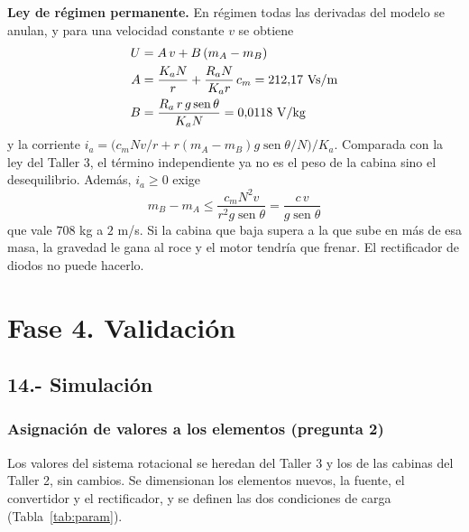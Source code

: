 \documentclass[10pt,a4paper,twocolumn]{article}
\DeclareMathOperator{\sen}{sen}
\begin{document}
\noindent\textbf{Ley de régimen permanente.} En régimen todas las derivadas del modelo se
anulan, y para una velocidad constante $v$ se obtiene
\begin{align}
  U &= A\,v + B\,(m_A - m_B) \label{eq:ley}\\
  A &= \frac{K_a N}{r} + \frac{R_a N}{K_a r}\,c_m = 212{,}17\ \mathrm{Vs/m} \notag\\
  B &= \frac{R_a\, r\, g\sen\theta}{K_a N} = 0{,}0118\ \mathrm{V/kg} \notag
\end{align}
y la corriente $i_a = \big(c_m N v/r + r(m_A-m_B)g\sen\theta/N\big)/K_a$. Comparada con la
ley del Taller 3, el término independiente ya no es el peso de la cabina sino el
desequilibrio. Además, $i_a\ge0$ exige
\begin{equation}
  m_B - m_A \le \frac{c_m N^2 v}{r^2 g\sen\theta} = \frac{c\,v}{g\sen\theta}
  \label{eq:lim}
\end{equation}
que vale $708$ kg a $2$ m/s. Si la cabina que baja supera a la que sube en más de esa masa,
la gravedad le gana al roce y el motor tendría que frenar. El rectificador de diodos no
puede hacerlo.

\section*{Fase 4. Validación}

\subsection*{14.- Simulación}

\subsubsection*{Asignación de valores a los elementos (pregunta 2)}

Los valores del sistema rotacional se heredan del Taller 3 y los de las cabinas del Taller
2, sin cambios. Se dimensionan los elementos nuevos, la fuente, el convertidor y el
rectificador, y se definen las dos condiciones de carga (Tabla~\ref{tab:param}).
\end{document}
